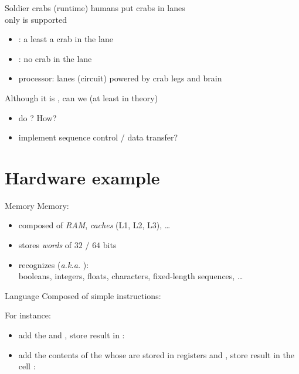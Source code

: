 \documentclass[10pt]{beamer}
\begin{document}
\begin{frame}{Soldier crabs (runtime)}
   humans put crabs in lanes
  \\\bigskip
   only  is supported
  \begin{itemize}
  \item {}: a least a crab in the lane
  \item {}: no crab in the lane
  \item processor: lanes (circuit) powered by crab legs and brain
  \end{itemize}
  \bigskip
  \pause
  Although it is , can we (at least in theory)
  \begin{itemize}
  \item do ? How?
  \item implement sequence control / data transfer?
  \end{itemize}
\end{frame}




\section{Hardware example}



\begin{frame}{Memory}
  Memory:
  \begin{itemize}
  \item composed of \emph{RAM}, \emph{caches} (L1, L2, L3), \ldots
  \item stores \emph{words} of $32$ / $64$ bits
  \item recognizes 
    (\textit{a.k.a.} ):\\
    booleans, integers, floats, characters, fixed-length sequences, \ldots
  \end{itemize}
\end{frame}


\begin{frame}{Language}
  Composed of simple instructions:
  \centerline{  }

  \smallskip
  For instance:
  \begin{itemize}
  \item add the   and , store result
    in :\\
    \centerline{  }
  \item add the contents of the  whose 
    are stored in registers  and , store result in the cell
     :\\
    \centerline{  }
  \end{itemize}
\end{frame}
\end{document}
